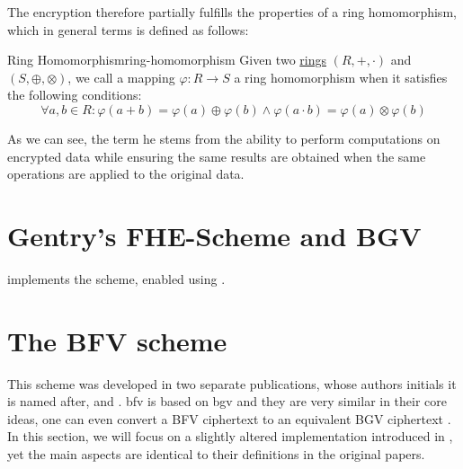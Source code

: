 The encryption therefore partially fulfills the properties of a ring homomorphism, which in general terms is defined as follows:

\begin{definition}{Ring Homomorphism}{ring-homomorphism}
  Given two \hyperref[def:ring]{rings} $(R, +, \cdot)$ and $(S, \oplus, \otimes)$, we call a mapping $\varphi: R \rightarrow S$ a ring homomorphism when it satisfies the following conditions:
  $$\forall a, b \in R: \varphi(a + b) = \varphi(a) \oplus \varphi(b) \wedge \varphi(a \cdot b) = \varphi(a) \otimes \varphi(b)$$
\end{definition}

As we can see, the term \gls{he} stems from the ability to perform computations on encrypted data while ensuring the same results are obtained when the same operations are applied to the original data.

\section{Gentry's FHE-Scheme and BGV}
\cite{2009-gentry-fhe-original}

\cite{seal-4.0} implements the scheme, enabled using .

\pagebreak
\section{The BFV scheme}
\label{sec:bfv}
This scheme was developed in two separate publications, whose authors initials it is named after, \cite{2012-brakerski} and \cite{2012-fv-original}.
\gls{bfv} is based on \gls{bgv} and they are very similar in their core ideas, one can even convert a BFV ciphertext to an equivalent BGV ciphertext \parencite{2021-he-revisiting}.
In this section, we will focus on a slightly altered implementation introduced in \cite{2014-fv-comparison}, yet the main aspects are identical to their definitions in the original papers.



